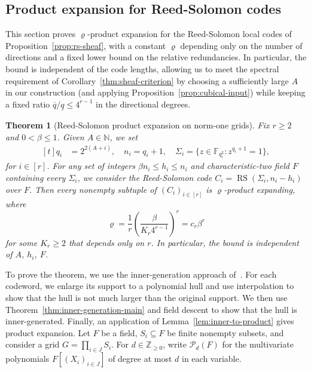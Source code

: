 \documentclass[11pt,letterpaper]{article}
\renewcommand{\le}{\leqslant}
\renewcommand{\ge}{\geqslant}
\newtheorem{theorem}{Theorem}[section]
\theoremstyle{definition}
\theoremstyle{remark}
\newcommand{\F}{\mathbb F}
\newcommand{\RS}{\operatorname{RS}}
\begin{document}
\subsection{Product expansion for Reed-Solomon codes}
\label{sec:local-chain}
This section proves $\varrho$-product expansion for the Reed-Solomon
local codes of Proposition~\ref{prop:rs-sheaf}, with a constant $\varrho$
depending only on the number of directions and a fixed lower
bound on the relative redundancies. 
In particular, the bound is independent of
the code lengths, allowing us to meet the
spectral requirement of Corollary~\ref{thm:sheaf-criterion} by choosing a sufficiently large $A$ in our construction (and applying Proposition~\ref{prop:cubical-input}) while keeping a fixed ratio $\overline q/\underline q\le4^{r-1}$ in the directional degrees.

\begin{theorem}[Reed-Solomon product expansion on norm-one grids]
\label{thm:rs-product-expansion}\label{lem:rs-product-expansion}
Fix $r\ge2$ and $0<\beta\le1$. Given $A \in \mathbb N$, we set
\begin{equation}
\begin{aligned}[t]
\label{eq:field-size-choice}
q_i&=2^{2(A+i)},\quad n_i = q_i + 1, \quad
\Sigma_i=\{z\in\F_{q_i^2}:z^{q_i+1}=1\},
\end{aligned}
\end{equation}
for $i\in [r]$. For any set of integers $\beta n_i\le h_i \le n_i$ and characteristic-two field $F$ containing every $\Sigma_i$, we consider the Reed-Solomon code $C_i = \RS(\Sigma_i,n_i-h_i)$ over $F$. Then every nonempty subtuple of $(C_{i})_{i \in [r]}$ is $\varrho$-product expanding,
where
\[
\varrho=\frac1r\left(\frac{\beta}{K_r4^{r-1}}\right)^r
      =c_r\beta^r
\]
for some $K_r\ge2$ that depends only on $r$.
In particular, the bound is independent of $A$, $h_i$, $F$.

\end{theorem}


To prove the theorem, we use the inner-generation approach
of~\cite{KalachevPanteleev2025}.
For each codeword, we enlarge its support to a polynomial hull and use interpolation to show that the hull is not much larger
than the original support.
We then use Theorem~\ref{thm:inner-generation-main} and field descent to show that
the hull is inner-generated.
Finally, an application of Lemma~\ref{lem:inner-to-product} gives product expansion.
Let $F$ be a field, $S_i\subseteq F$ be finite nonempty subsets, and consider a grid $G=\prod_{i\in J}S_i$. For $d\in\mathbb Z_{\ge0}$, write
$\mathcal P_d(F)$ for the multivariate polynomials $F[(X_i)_{i\in J}]$ of
degree at most $d$ in each variable.
\end{document}
